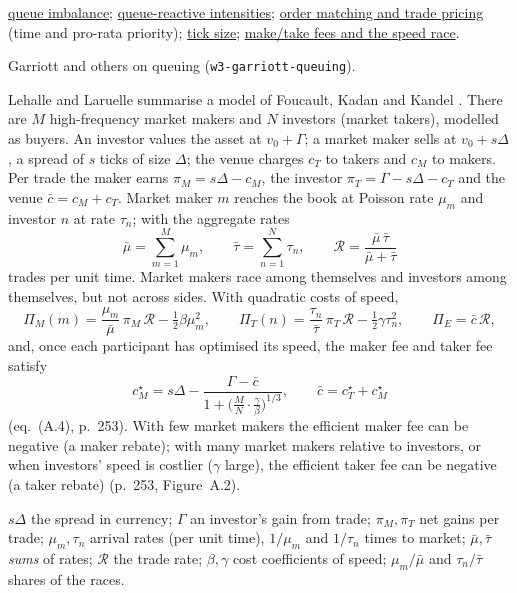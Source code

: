 \begin{qfresult}
 \hyperref[def:queue-imbalance]{queue imbalance}; \hyperref[mod:queue-reactive-intensities]{queue-reactive intensities}; \hyperref[mech:order-matching-pricing]{order matching and trade pricing} (time and pro-rata priority); \hyperref[def:tick-size]{tick size}; \hyperref[mod:make-take-fee-speed-race]{make/take fees and the speed race}.

 Garriott and others on queuing (\nolinkurl{w3-garriott-queuing}).

\end{qfresult}

\begin{qfmodel}\label{mod:make-take-fee-speed-race}
 Lehalle and Laruelle summarise a model of Foucault, Kadan and Kandel \citep[app.~A, sec.~A.2, pp.~250--253]{alpha-laruelle}. There are $M$ high-frequency market makers and $N$ investors (market takers), modelled as buyers. An investor values the asset at $v_0+\Gamma$; a market maker sells at $v_0+s\Delta$, a spread of $s$ ticks of size $\Delta$; the venue charges $c_T$ to takers and $c_M$ to makers. Per trade the maker earns $\pi_M=s\Delta-c_M$, the investor $\pi_T=\Gamma-s\Delta-c_T$ and the venue $\bar c=c_M+c_T$. Market maker $m$ reaches the book at Poisson rate $\mu_m$ and investor $n$ at rate $\tau_n$; with the aggregate rates
\[ \bar\mu=\sum_{m=1}^{M}\mu_m,\qquad \bar\tau=\sum_{n=1}^{N}\tau_n,\qquad \mathcal R=\frac{\bar\mu\,\bar\tau}{\bar\mu+\bar\tau} \]
trades per unit time. Market makers race among themselves and investors among themselves, but not across sides. With quadratic costs of speed,
\[ \Pi_M(m)=\frac{\mu_m}{\bar\mu}\,\pi_M\,\mathcal R-\tfrac12\beta\mu_m^2,\qquad \Pi_T(n)=\frac{\tau_n}{\bar\tau}\,\pi_T\,\mathcal R-\tfrac12\gamma\tau_n^2,\qquad \Pi_E=\bar c\,\mathcal R, \]
and, once each participant has optimised its speed, the maker fee and taker fee satisfy
\[ c_M^\star=s\Delta-\frac{\Gamma-\bar c}{1+\bigl(\frac{M}{N}\cdot\frac{\gamma}{\beta}\bigr)^{1/3}},\qquad \bar c=c_T^\star+c_M^\star \]
(eq.~(A.4), p.~253). With few market makers the efficient maker fee can be negative (a maker rebate); with many market makers relative to investors, or when investors' speed is costlier ($\gamma$ large), the efficient taker fee can be negative (a taker rebate) (p.~253, Figure~A.2).

 $s\Delta$ the spread in currency; $\Gamma$ an investor's gain from trade; $\pi_M,\pi_T$ net gains per trade; $\mu_m,\tau_n$ arrival rates (per unit time), $1/\mu_m$ and $1/\tau_n$ times to market; $\bar\mu,\bar\tau$ \emph{sums} of rates; $\mathcal R$ the trade rate; $\beta,\gamma$ cost coefficients of speed; $\mu_m/\bar\mu$ and $\tau_n/\bar\tau$ shares of the races.


\end{qfmodel}
